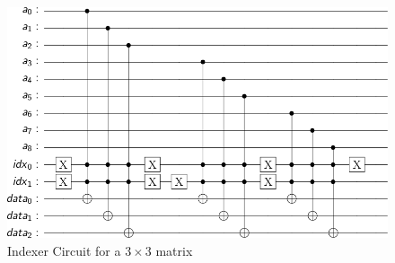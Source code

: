 \documentclass[10pt]{proc}
\theoremstyle{definition}
\theoremstyle{remark}
\begin{document}
\begin{figure}
  \centering
  \includegraphics[scale=0.3]{results/indexer_3x3.png} 
  \caption{Indexer Circuit for a $3 \times 3$ matrix}
  \label{fig:indexer_circuit_3x3}
\end{figure}
\end{document}
